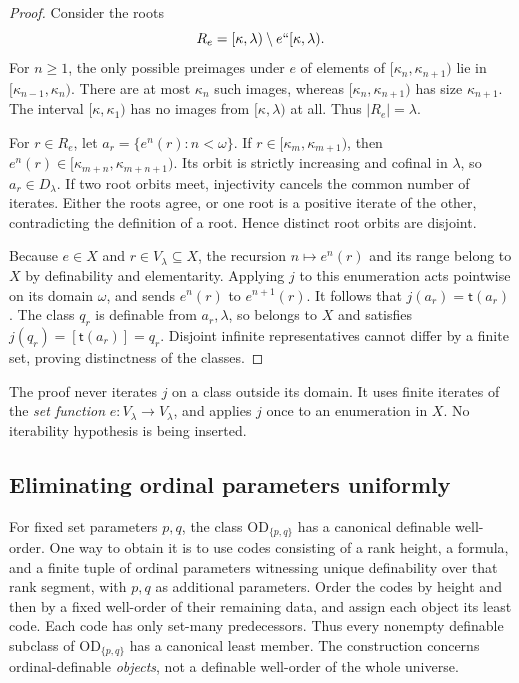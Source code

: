 \documentclass[11pt,letterpaper]{article}
\theoremstyle{definition}
\newcommand{\OD}{\mathrm{OD}}
\newcommand{\Dlam}{D_\lambda}
\newcommand{\tail}{\mathsf t}
\begin{document}
\begin{proof}
Consider the roots
\[
 R_e=[\kappa,\lambda)\setminus e``[\kappa,\lambda).
\]
For $n\ge1$, the only possible preimages under $e$ of elements of $[\kappa_n,\kappa_{n+1})$ lie in $[\kappa_{n-1},\kappa_n)$. There are at most $\kappa_n$ such images, whereas $[\kappa_n,\kappa_{n+1})$ has size $\kappa_{n+1}$. The interval $[\kappa,\kappa_1)$ has no images from $[\kappa,\lambda)$ at all. Thus $|R_e|=\lambda$.

For $r\in R_e$, let $a_r=\{e^n(r):n<\omega\}$. If $r\in[\kappa_m,\kappa_{m+1})$, then $e^n(r)\in[\kappa_{m+n},\kappa_{m+n+1})$. Its orbit is strictly increasing and cofinal in $\lambda$, so $a_r\in\Dlam$. If two root orbits meet, injectivity cancels the common number of iterates. Either the roots agree, or one root is a positive iterate of the other, contradicting the definition of a root. Hence distinct root orbits are disjoint.

Because $e\in X$ and $r\in V_\lambda\subseteq X$, the recursion $n\mapsto e^n(r)$ and its range belong to $X$ by definability and elementarity. Applying $j$ to this enumeration acts pointwise on its domain $\omega$, and sends $e^n(r)$ to $e^{n+1}(r)$. It follows that $j(a_r)=\tail(a_r)$. The class $q_r$ is definable from $a_r,\lambda$, so belongs to $X$ and satisfies $j(q_r)=[\tail(a_r)]=q_r$. Disjoint infinite representatives cannot differ by a finite set, proving distinctness of the classes.
\end{proof}

The proof never iterates $j$ on a class outside its domain. It uses finite iterates of the \emph{set function} $e:V_\lambda\to V_\lambda$, and applies $j$ once to an enumeration in $X$. No iterability hypothesis is being inserted.

\subsection{Eliminating ordinal parameters uniformly}

For fixed set parameters $p,q$, the class $\OD_{\{p,q\}}$ has a canonical definable well-order. One way to obtain it is to use codes consisting of a rank height, a formula, and a finite tuple of ordinal parameters witnessing unique definability over that rank segment, with $p,q$ as additional parameters. Order the codes by height and then by a fixed well-order of their remaining data, and assign each object its least code. Each code has only set-many predecessors. Thus every nonempty definable subclass of $\OD_{\{p,q\}}$ has a canonical least member. The construction concerns ordinal-definable \emph{objects}, not a definable well-order of the whole universe.
\end{document}
